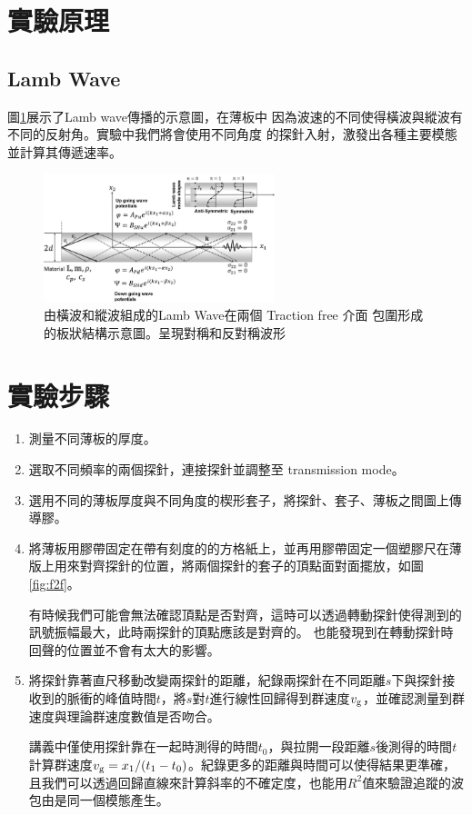 \documentclass[12pt]{report}
\begin{document}
\section{實驗原理}

\subsection{Lamb Wave}

圖\ref{fig:lw}展示了Lamb wave傳播的示意圖，在薄板中
因為波速的不同使得橫波與縱波有不同的反射角。實驗中我們將會使用不同角度
的探針入射，激發出各種主要模態並計算其傳遞速率。
\begin{figure}[htbp]
    \centering
    \includegraphics[width=0.6\textwidth]{lamb_wave_scheme.png}
    \caption{由橫波和縱波組成的Lamb Wave在兩個 Traction free 介面
    包圍形成的板狀結構示意圖。呈現對稱和反對稱波形}
    \label{fig:lw}
\end{figure}

\section{實驗步驟}

\begin{enumerate}
    \item 測量不同薄板的厚度。
    \item 選取不同頻率的兩個探針，連接探針並調整至 transmission mode。
    \item 選用不同的薄板厚度與不同角度的楔形套子，將探針、套子、薄板之間圖上傳導膠。

    \item 將薄板用膠帶固定在帶有刻度的的方格紙上，並再用膠帶固定一個塑膠尺在薄版上用來對齊探針的位置，將兩個探針的套子的頂點面對面擺放，如圖\ref{fig:f2f}。
    
    有時候我們可能會無法確認頂點是否對齊，這時可以透過轉動探針使得測到的訊號振幅最大，此時兩探針的頂點應該是對齊的。
    也能發現到在轉動探針時回聲的位置並不會有太大的影響。

    \item 將探針靠著直尺移動改變兩探針的距離，紀錄兩探針在不同距離$s$下與探針接收到的脈衝的峰值時間$t$，將$s$對$t$進行線性回歸得到群速度$v_{\rm g}$，並確認測量到群速度與理論群速度數值是否吻合。

    講義中僅使用探針靠在一起時測得的時間$t_0$，與拉開一段距離$s$後測得的時間$t$計算群速度$v_{\rm g}= 
    x_1/(t_1-t_0)$。紀錄更多的距離與時間可以使得結果更準確，且我們可以透過回歸直線來計算斜率的不確定度，也能用$R^2$值來驗證追蹤的波包由是同一個模態產生。
\end{enumerate}
\end{document}
